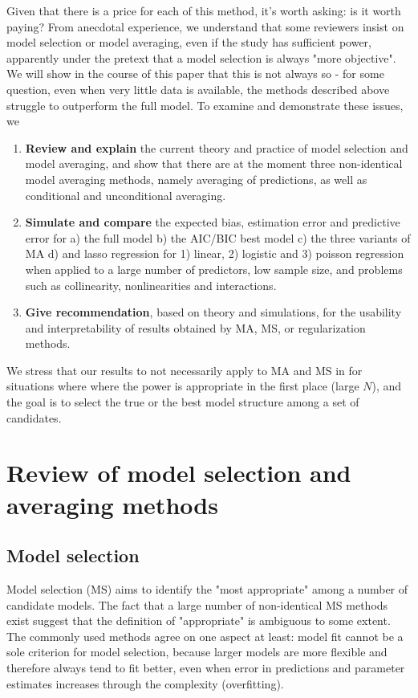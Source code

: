 \documentclass[5p]{elsarticle}
\begin{document}
Given that there is a price for each of this method, it's worth asking: is it worth paying? From anecdotal experience, we understand that some reviewers insist on model selection or model averaging, even if the study has sufficient power, apparently under the pretext that a model selection is always "more objective". We will show in the course of this paper that this is not always so - for some question, even when very little data is available, the methods described above struggle to outperform the full model. To examine and demonstrate these issues, we 

\begin{enumerate}
\item \textbf{Review and explain} the current theory and practice of model selection and model averaging, and show that there are at the moment three non-identical model averaging methods, namely averaging of predictions, as well as conditional and unconditional averaging. 
\item \textbf{Simulate and compare} the expected bias, estimation error and predictive error for a) the full model b) the AIC/BIC best model c) the three variants of MA d) and lasso regression for 1) linear, 2) logistic and 3) poisson regression when applied to a large number of predictors, low sample size, and problems such as collinearity, nonlinearities and interactions. 
\item \textbf{Give recommendation}, based on theory and simulations, for the usability and interpretability of results obtained by MA, MS, or regularization methods.  
\end{enumerate}

We stress that our results to not necessarily apply to MA and MS in for situations where where the power is appropriate in the first place (large $N$), and the goal is to select the true or the best model structure among a set of candidates. 

\section{Review of model selection and averaging methods}

\subsection{Model selection}

Model selection (MS) aims to identify the "most appropriate" among a number of candidate models. The fact that a large number of non-identical MS methods exist suggest that the definition of "appropriate" is ambiguous to some extent. The commonly used methods agree on one aspect at least: model fit cannot be a sole criterion for model selection, because larger models are more flexible and therefore always tend to fit better, even when error in predictions and parameter estimates increases through the complexity (overfitting). 
\end{document}
